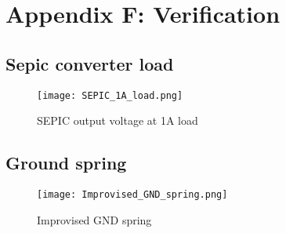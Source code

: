 \chapter*{Appendix F: Verification} \label{chap:Appendix-C-Verification}

\section*{Sepic converter load} \label{Appendix-SEPIC-converter-load}
{}
\begin{figure}[!htb]
    \texttt{[image: SEPIC\_1A\_load.png]}
    \caption{SEPIC output voltage at 1A load}
    \label{fig:Verification_SEPIC_1A_Load}
\end{figure}
\newpage

\section*{Ground spring} \label{Appendix-Ground-spring}
\begin{figure}[!htb]
    \texttt{[image: Improvised\_GND\_spring.png]}
    \caption{Improvised GND spring}
    \label{fig:Improvised_GND_spring}
\end{figure}